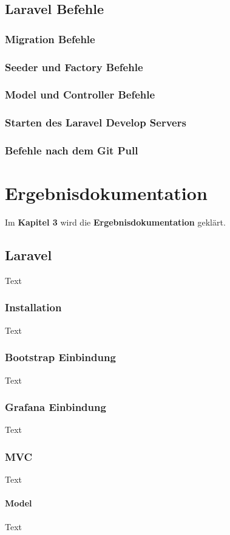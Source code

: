 \section{Laravel Befehle}
\subsection{Migration Befehle}
\subsection{Seeder und Factory Befehle}
\subsection{Model und Controller Befehle}
\subsection{Starten des Laravel Develop Servers}
\subsection{Befehle nach dem Git Pull} 



\chapter{Ergebnisdokumentation }
Im \textbf{Kapitel 3} wird die \textbf{Ergebnisdokumentation} geklärt.

\section{Laravel }
Text
\subsection{Installation}
Text
\subsection{Bootstrap Einbindung}
Text
\subsection{Grafana Einbindung}
Text
\subsection{MVC}
Text
\subsubsection{Model}
Text
